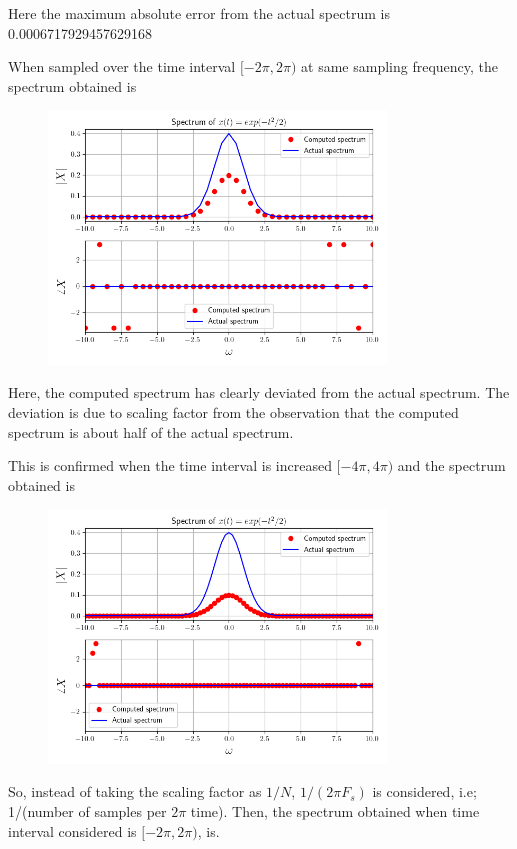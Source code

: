 \documentclass[12pt, a4paper]{article}
\begin{document}
Here the maximum absolute error from the actual spectrum is 0.0006717929457629168

When sampled over the time interval $[-2\pi, 2\pi)$ at same sampling frequency, the spectrum obtained is

\begin{figure}[H]
\centering
\includegraphics[width=0.8\textwidth]{q4_2.png}
\end{figure}

Here, the computed spectrum has clearly deviated from the actual spectrum. The deviation is due to scaling factor from the observation that the computed spectrum is about half of the actual spectrum.

This is confirmed when the time interval is increased $[-4\pi, 4\pi)$ and the spectrum obtained is 

\begin{figure}[H]
\centering
\includegraphics[width=0.8\textwidth]{q4_3.png}
\end{figure}

So, instead of taking the scaling factor as $1/N$, $1/(2\pi F_s)$ is considered, i.e; 1/(number of samples per $2\pi$ time). Then, the spectrum obtained when time interval considered is $[-2\pi, 2\pi)$, is.
\end{document}
